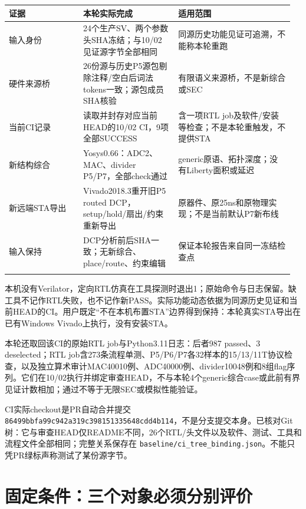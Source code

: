 \documentclass[UTF8,fontset=fandol,10pt,a4paper,openany]{ctexrep}
\newcommand{\code}[1]{\nolinkurl{#1}}
\begin{document}
\begingroup\small\setlength{\tabcolsep}{2pt}\renewcommand{\arraystretch}{1.25}\begin{longtable}{@{}>{\raggedright\arraybackslash}p{0.25\linewidth}>{\raggedright\arraybackslash}p{0.32\linewidth}>{\raggedright\arraybackslash}p{0.39\linewidth}@{}}
\toprule
\textbf{证据} & \textbf{本轮实际完成} & \textbf{适用范围}\\\midrule\endhead
输入身份 & 24个生产SV、两个参数头SHA冻结；与10/02见证源字节全部相同 & 同源历史功能见证可追溯，不能称本轮重跑\\\addlinespace[2pt]
硬件来源桥 & 26份源与历史P5源包剔除注释/空白后词法tokens一致；源包成员SHA核验 & 有限语义来源桥，不是新综合或SEC\\\addlinespace[2pt]
当前CI记录 & 读取并封存对应当前HEAD的10/02 CI，9项全部SUCCESS & 含一项RTL job及软件/安装等检查；不是本轮重触发，不提供STA\\\addlinespace[2pt]
新结构综合 & Yosys0.66：ADC2、MAC、divider P5/P7，全部check通过 & generic原语、拓扑深度；没有Liberty面积或延迟\\\addlinespace[2pt]
新远端STA导出 & Vivado2018.3重开旧P5 routed DCP，setup/hold/扇出/约束重新导出 & 原器件、原25ns和原物理实现；不是当前默认P7新布线\\\addlinespace[2pt]
输入保持 & DCP分析前后SHA一致；无新综合、place/route、约束编辑 & 保证本轮报告来自同一冻结检查点\\\addlinespace[2pt]
\bottomrule\end{longtable}\endgroup


本机没有Verilator，定向RTL仿真在工具探测时退出1；原始命令与日志保留。缺工具不记作RTL失败，也不记作新PASS。实际功能动态依据为同源历史见证和当前HEAD的CI。用户既定“不在本机布置STA”边界得到保持：本轮真实STA导出在已有Windows Vivado上执行，没有安装STA。


本轮还取回该CI的原始RTL job与Python3.11日志：后者987 passed、3 deselected；RTL job含273条流程单测、P5/P6/P7各32样本的15/13/11T协议检查，以及独立算术审计MAC40010例、ADC40000例、divider10048例和8组flag序列。它们在10/02执行并绑定审查HEAD，不与本轮4个generic综合case或此前有界见证计数相加；通过不等于无限SEC或模拟性能验证。


CI实际checkout是PR自动合并提交 \code{86499bbfa99c942a319c398151335648cdd4b114}，不是分支提交本身。已核对Git树：它与审查HEAD仅README不同，26个RTL/头文件以及软件、测试、工具和流程文件全部相同；完整关系保存在 \code{baseline/ci_tree_binding.json}。不能只凭PR绿标声称测试了某份源字节。


\section{固定条件：三个对象必须分别评价}
\end{document}
